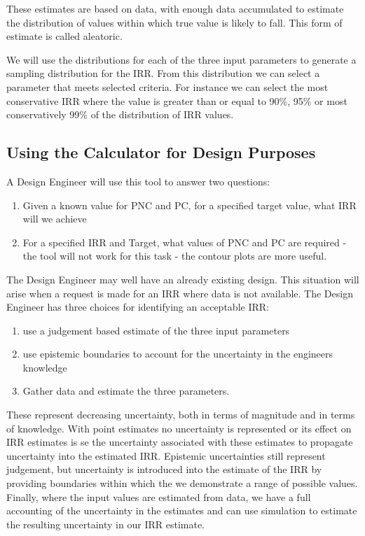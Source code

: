 \documentclass[
]{article}
\providecommand{\tightlist}{%
  \setlength{\itemsep}{0pt}\setlength{\parskip}{0pt}}
\begin{document}
These estimates are based on data, with enough data accumulated to estimate the distribution of values within which true value is likely to fall. This form of estimate is called aleatoric.

We will use the distributions for each of the three input parameters to generate a sampling distribution for the IRR. From this distribution we can select a parameter that meets selected criteria. For instance we can select the most conservative IRR where the value is greater than or equal to 90\%, 95\% or most conservatively 99\% of the distribution of IRR values.

\subsection{Using the Calculator for Design Purposes}\label{using-the-calculator-for-design-purposes}

A Design Engineer will use this tool to answer two questions:

\begin{enumerate}
\def\labelenumi{\arabic{enumi}.}
\tightlist
\item
  Given a known value for PNC and PC, for a specified target value, what IRR will we achieve
\item
  For a specified IRR and Target, what values of PNC and PC are required - the tool will not work for this task - the contour plots are more useful.
\end{enumerate}

The Design Engineer may well have an already existing design. This situation will arise when a request is made for an IRR where data is not available. The Design Engineer has three choices for identifying an acceptable IRR:

\begin{enumerate}
\def\labelenumi{\arabic{enumi}.}
\tightlist
\item
  use a judgement based estimate of the three input parameters
\item
  use epistemic boundaries to account for the uncertainty in the engineers knowledge
\item
  Gather data and estimate the three parameters.
\end{enumerate}

These represent decreasing uncertainty, both in terms of magnitude and in terms of knowledge. With point estimates no uncertainty is represented or its effect on IRR estimates is se the uncertainty associated with these estimates to propagate uncertainty into the estimated IRR. Epistemic uncertainties still represent judgement, but uncertainty is introduced into the estimate of the IRR by providing boundaries within which the we demonstrate a range of possible values. Finally, where the input values are estimated from data, we have a full accounting of the uncertainty in the estimates and can use simulation to estimate the resulting uncertainty in our IRR estimate.
\end{document}
